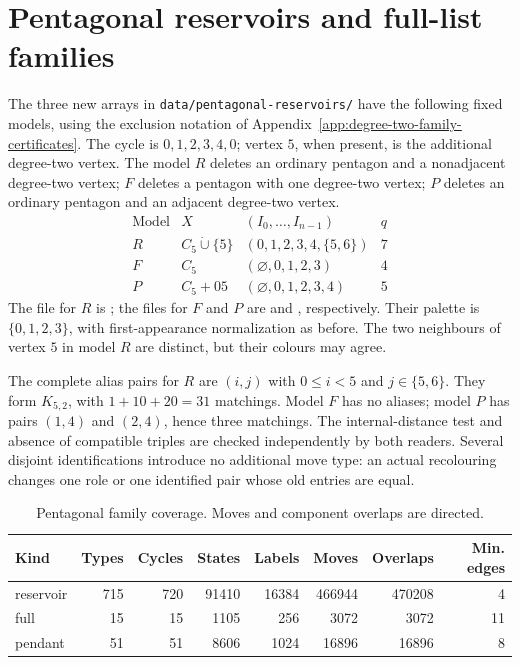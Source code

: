 \documentclass[11pt]{article}
\numberwithin{equation}{section}
\numberwithin{table}{section}
\begin{document}
\section{Pentagonal reservoirs and full-list families}
\label{app:pentagonal-reservoir-certificates}
The three new arrays in \texttt{data/pentagonal-reservoirs/} have the
following fixed models, using the exclusion notation of
Appendix~\ref{app:degree-two-family-certificates}. The cycle is
$0,1,2,3,4,0$; vertex $5$, when present, is the additional degree-two
vertex. The model $R$ deletes an ordinary pentagon and a nonadjacent
degree-two vertex; $F$ deletes a pentagon with one degree-two vertex;
$P$ deletes an ordinary pentagon and an adjacent degree-two vertex.
\[
\begin{array}{cclc}
\text{Model}&X&(I_0,\ldots,I_{n-1})&q\\ \hline
R&C_5\mathbin{\dot\cup}\{5\}&(0,1,2,3,4,\{5,6\})&7\\
F&C_5&(\varnothing,0,1,2,3)&4\\
P&C_5+05&(\varnothing,0,1,2,3,4)&5
\end{array}
\]
The file for $R$ is ; the files for $F$
and $P$ are  and
, respectively. Their palette is $\{0,1,2,3\}$,
with first-appearance normalization as before. The two neighbours of
vertex $5$ in model $R$ are distinct, but their colours may agree.

The complete alias pairs for $R$ are $(i,j)$ with $0\le i<5$ and
$j\in\{5,6\}$. They form $K_{5,2}$, with
$1+10+20=31$ matchings. Model $F$ has no aliases; model $P$ has pairs
$(1,4)$ and $(2,4)$, hence three matchings. The internal-distance test
and absence of compatible triples are checked independently by both
readers. Several disjoint identifications introduce no additional move
type: an actual recolouring changes one role or one identified pair
whose old entries are equal.

\begin{table}[htbp]
\centering\small
\caption{Pentagonal family coverage. Moves and component overlaps are directed.}
\label{tab:pentagonal-reservoir-counts}
\begin{tabular}{lrrrrrrr}
\toprule
Kind & Types & Cycles & States & Labels & Moves & Overlaps & Min. edges\\
\midrule
reservoir&715&720&91410&16384&466944&470208&4\\
full&15&15&1105&256&3072&3072&11\\
pendant&51&51&8606&1024&16896&16896&8\\
\bottomrule
\end{tabular}
\end{table}
\end{document}
